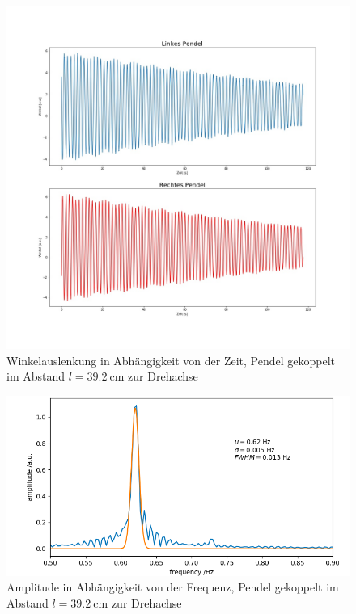 \begin{figure}[H]
	\centering
	\includegraphics[height = 0.5 \textheight]{figures/211-9.jpeg}
	\caption{Winkelauslenkung in Abhängigkeit von der Zeit, Pendel gekoppelt im Abstand $l = \SI{39,2}{\cm}$ zur Drehachse}
\end{figure}
\begin{figure}[H]
	\centering
	\includegraphics[height = 0.23 \textheight]{figures/211-10.jpeg}
	\caption{Amplitude in Abhängigkeit von der Frequenz, Pendel gekoppelt im Abstand $l = \SI{39,2}{\cm}$ zur Drehachse}
\end{figure}


